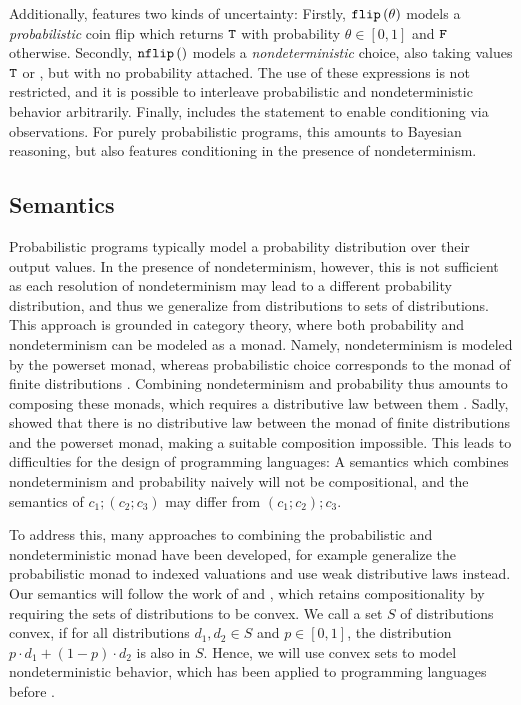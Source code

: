 Additionally, \NDICE features two kinds of uncertainty:
Firstly, $\texttt{flip} \left(\theta\right) $ models a \emph{probabilistic} coin flip which returns $\texttt{T}$ with probability $\theta \in [0, 1]$ and $\texttt{F}$ otherwise.
Secondly, $\texttt{nflip}\left(\right) $ models a \emph{nondeterministic} choice, also taking values $\texttt{T}$ or \FALSE, but with no probability attached.
The use of these expressions is not restricted, and it is possible to interleave probabilistic and nondeterministic behavior arbitrarily.
Finally, \NDICE includes the statement  to enable conditioning via observations. 
For purely probabilistic programs, this amounts to Bayesian reasoning, but \NDICE also features conditioning in the presence of nondeterminism.


\subsection{Semantics}

Probabilistic programs typically model a probability distribution over their output values. 
In the presence of nondeterminism, however, this is not sufficient as each resolution of nondeterminism may lead to a different probability distribution, and thus we generalize from distributions to sets of distributions.
This approach is grounded in category theory, where both probability and nondeterminism can be modeled as a monad. 
Namely, nondeterminism is modeled by the powerset monad, whereas probabilistic choice corresponds to the monad of finite distributions \cite{goy2020combining}.
Combining nondeterminism and probability thus amounts to composing these monads, which requires a distributive law between them \cite{beck1969distributive}.
%
Sadly, \citet{varacca2006distributing} showed that there is no distributive law between the monad of finite distributions and the powerset monad, making a suitable composition impossible.
This leads to difficulties for the design of programming languages:
A semantics which combines nondeterminism and probability naively will not be compositional, and the semantics of $c_1; (c_2; c_3)$ may differ from $(c_1; c_2); c_3$.

To address this, many approaches to combining the probabilistic and nondeterministic monad have been developed, for example \citet{varacca2006distributing} generalize the probabilistic monad to indexed valuations and \citet{goy2020combining} use weak distributive laws instead.
Our semantics will follow the work of \citet{mislove2000nondeterminism} and \citet{tix2009semantic}, which retains compositionality by requiring the sets of distributions to be convex.
We call a set $S$ of distributions convex, if for all distributions $d_1, d_2 \in S$ and $p \in [0,1]$, the distribution $p\cdot d_1 + (1-p)\cdot d_2$ is also in $S$.
Hence, we will use convex sets to model nondeterministic behavior, which has been applied to programming languages before \cite{zilberstein2025demonic, varacca2006distributing, jifeng1997probabilistic}. 
\\


